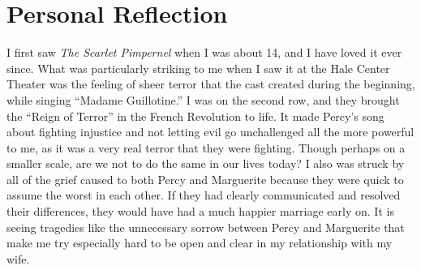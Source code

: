 \documentclass[onecolumn, 12pt]{article}
\begin{document}
\section*{Personal Reflection}

I first saw \emph{The Scarlet Pimpernel} when I was about 14, and I have loved
it ever since.  What was particularly striking to me when I saw it at the Hale
Center Theater was the feeling of sheer terror that the cast created during the
beginning, while singing ``Madame Guillotine.''  I was on the second row, and
they brought the ``Reign of Terror'' in the French Revolution to life.  It made
Percy's song about fighting injustice and not letting evil go unchallenged all
the more powerful to me, as it was a very real terror that they were fighting.
Though perhaps on a smaller scale, are we not to do the same in our lives
today?  I also was struck by all of the grief caused to both Percy and
Marguerite because they were quick to assume the worst in each other.  If they
had clearly communicated and resolved their differences, they would have had a
much happier marriage early on.  It is seeing tragedies like the unnecessary
sorrow between Percy and Marguerite that make me try especially hard to be open
and clear in my relationship with my wife.
\end{document}
